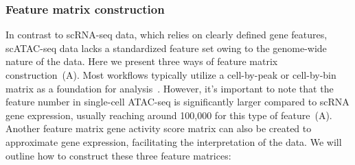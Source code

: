 \subsubsection{Feature matrix construction}
\label{background:sec2:scATAC:matrixconstruction}
In contrast to scRNA-seq data, which relies on clearly defined gene features, scATAC-seq data lacks a standardized feature set owing to the genome-wide nature of the data. Here we present three ways of feature matrix construction~(A). Most workflows typically utilize a cell-by-peak or cell-by-bin matrix as a foundation for analysis~\citep{heumos2023best}. However, it's important to note that the feature number in single-cell ATAC-seq is significantly larger compared to scRNA gene expression, usually reaching around 100,000 for this type of feature~(A). Another feature matrix gene activity score matrix can also be created to approximate gene expression, facilitating the interpretation of the data. We will outline how to construct these three feature matrices:
